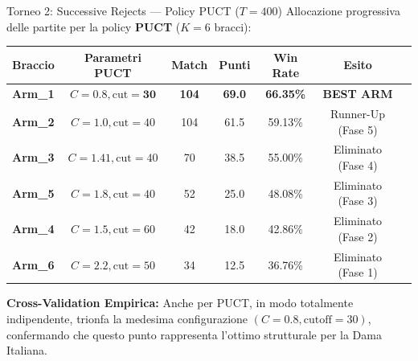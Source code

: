 \documentclass[10pt]{beamer}
\begin{document}
\begin{frame}{Torneo 2: Successive Rejects — Policy PUCT ($T=400$)}
    Allocazione progressiva delle partite per la policy \textbf{PUCT} ($K=6$ bracci):
    
    \vspace{0.2cm}
    \centering
    \small
    \begin{tabular}{lcccccl}
        \toprule
        \textbf{Braccio} & \textbf{Parametri PUCT} & \textbf{Match} & \textbf{Punti} & \textbf{Win Rate} & \textbf{Esito} \\
        \midrule
        \textbf{Arm\_1} & $C = \mathbf{0.8}, \text{cut} = \mathbf{30}$ & \textbf{104} & \textbf{69.0} & \textbf{66.35\%} & \textbf{BEST ARM} \\
        \textbf{Arm\_2} & $C = 1.0, \text{cut} = 40$ & 104 & 61.5 & 59.13\% & Runner-Up (Fase 5) \\
        \textbf{Arm\_3} & $C = 1.41, \text{cut} = 40$ & 70 & 38.5 & 55.00\% & Eliminato (Fase 4) \\
        \textbf{Arm\_5} & $C = 1.8, \text{cut} = 40$ & 52 & 25.0 & 48.08\% & Eliminato (Fase 3) \\
        \textbf{Arm\_4} & $C = 1.5, \text{cut} = 60$ & 42 & 18.0 & 42.86\% & Eliminato (Fase 2) \\
        \textbf{Arm\_6} & $C = 2.2, \text{cut} = 50$ & 34 & 12.5 & 36.76\% & Eliminato (Fase 1) \\
        \bottomrule
    \end{tabular}
    
    \vspace{0.3cm}
    \raggedright
    \footnotesize
    \textbf{Cross-Validation Empirica:} Anche per PUCT, in modo totalmente indipendente, trionfa la medesima configurazione $(C=0.8, \text{cutoff}=30)$, confermando che questo punto rappresenta l'ottimo strutturale per la Dama Italiana.
\end{frame}
\end{document}

